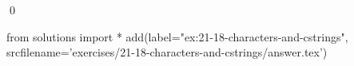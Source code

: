 
\begin{ex}
  \label{ex:21-18-characters-and-cstrings}
  
  \qed
\end{ex}
\begin{python0}
from solutions import *
add(label="ex:21-18-characters-and-cstrings",
    srcfilename='exercises/21-18-characters-and-cstrings/answer.tex')
\end{python0}
